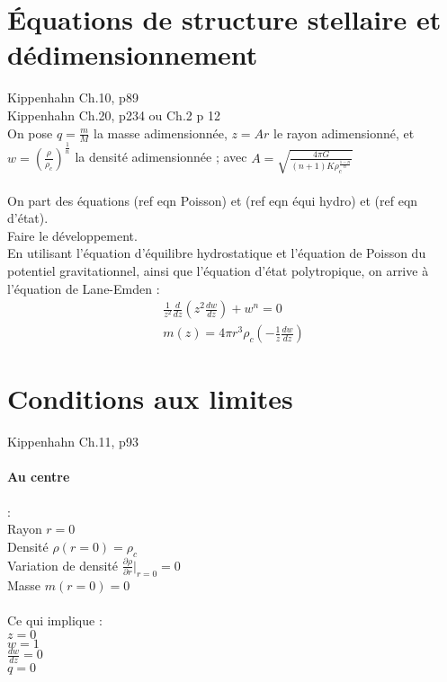 \documentclass[a4paper,10pt]{article}
\begin{document}
\newpage
\section{Équations de structure stellaire et dédimensionnement}
Kippenhahn Ch.10, p89\\
Kippenhahn Ch.20, p234 ou Ch.2 p 12\\


On pose $q=\frac{m}{M}$ la masse adimensionnée, $z=A r$ le rayon adimensionné, et $w=(\frac{\rho}{\rho_c})^{\frac{1}{n}}$ la densité adimensionnée ; avec $A=\sqrt{\frac{4 \pi G}{(n+1) K \rho_c^{\frac{1-n}{n}}}}$ \\
\\
On part des équations (ref eqn Poisson) et (ref eqn équi hydro) et (ref eqn d'état).\\
Faire le développement.\\

En utilisant l'équation d'équilibre hydrostatique et l'équation de Poisson du potentiel gravitationnel, ainsi que l'équation d'état polytropique, on arrive à l'équation de Lane-Emden :\\
\begin{eqnarray}
\frac{1}{z^2}\frac{d}{dz}(z^2 \frac{d w}{dz}) + w^n=0\\
m(z)=4 \pi r^3 \rho_c \left(- \frac{1}{z} \frac{dw}{dz}\right)
\end{eqnarray}

\newpage
\section{Conditions aux limites}
Kippenhahn Ch.11, p93
\paragraph{Au centre}: \\
Rayon $r=0$ \\
Densité $\rho (r=0) = \rho_c$ \\
Variation de densité $\frac{\partial \rho}{\partial r}\vert_{r=0} = 0$ \\
Masse $m(r=0)=0$ \\
\\
Ce qui implique : \\
$z=0$ \\
$w=1$ \\
$\frac{dw}{dz}=0$ \\
$q=0$
\end{document}
